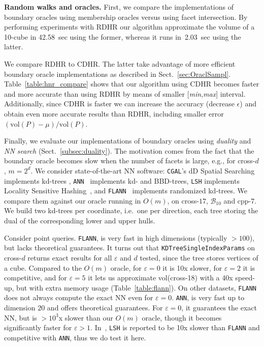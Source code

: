 \documentclass[11pt,a4paper]{article}
\def\B{{\mathcal B}} \def\E{{\mathcal E}}
\def\vol{\mbox{vol}}
\def\vol{\mbox{vol}}
\def\Min{{\it min}}
\def\Max{{\it max}}
\begin{document}
\vspace{.5em}
\textbf{Random walks and oracles.}
First, we compare the implementations of boundary oracles using membership oracles versus using facet intersection.  
By performing experiments with RDHR our algorithm
approximate the volume of a 10-cube in 42.58~sec using the former,
whereas it runs in~2.03~sec using the latter. 

We compare RDHR to CDHR. The latter take advantage of more efficient boundary oracle implementations as described in Sect.~\ref{sec:OraclSampl}.
Table~\ref{table:hnr_compare} shows that our algorithm using CDHR
becomes faster and more accurate than using RDHR by means of smaller
[\Min,\Max] interval.
Additionally, since CDHR is faster we can increase the accuracy
(decrease $\epsilon$) and obtain even more accurate results than RDHR,
including smaller error $(\vol(P)-\mu)/\vol(P)$. 

Finally, we evaluate our implementations of boundary oracles using {\it duality} and {\it NN search} (Sect.~\ref{subsec:duality}). The motivation comes from the fact that the boundary oracle becomes slow when the number of facets is large, e.g., for cross-$d$, $m=2^d$. 
We consider state-of-the-art NN software:
{\tt CGAL}'s dD Spatial Searching implements kd-trees \cite{CGALKDtree},
{\tt ANN}~\cite{ANN97} implements kd- and BBD-trees,
{\tt LSH} implements Locality Sensitive Hashing~\cite{Andoni08},
and {\tt FLANN}~\cite{Muj11} implements randomized kd-trees.   
We compare them against our oracle running in $O(m)$, on
cross-$17$, $\B_{10}$ and cpp-$7$.
We build two kd-trees per coordinate, i.e.\ one per direction, each
tree storing the dual of the corresponding lower and upper hulls.

Consider point queries.  
{\tt FLANN}, is very fast in high dimensions
(typically $>100$), but lacks theoretical guarantees.
It turns out that {\tt KDTreeSingleIndexParams} on cross-$d$ returns
exact results for all $\varepsilon$ and $d$ tested, since the tree stores vertices of a cube.
Compared to the $O(m)$ oracle, for $\varepsilon=0$ it is 10x slower,
for $\varepsilon=2$ it is competitive, and for $\varepsilon=5$ it lets us approximate
vol(cross-18) with a 40x speed-up, but with extra memory usage
(Table~\ref{table:flann}).   
On other datasets, {\tt FLANN} does not always compute the exact NN 
even for $\varepsilon=0$.
{\tt ANN}, is very fast up to dimension $20$ and
offers theoretical guarantees. For $\varepsilon=0$, it guarantees the exact NN,
but is $>10^3$x slower than our $O(m)$ oracle, though it becomes
significantly faster for $\varepsilon>1$. In~\cite{Muja09}, {\tt LSH} is reported to be 10x slower than {\tt FLANN}
and competitive with {\tt ANN}, thus we do test it here.
\end{document}
